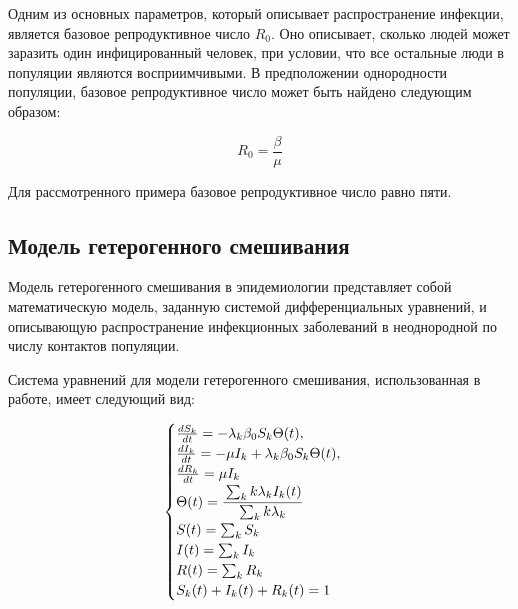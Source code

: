 \documentclass[14pt,a4paper]{article}
\begin{document}
 
 
Одним из основных параметров, который описывает распространение инфекции, является базовое репродуктивное число $R_0$. Оно описывает, сколько людей может заразить один инфицированный человек, при условии, что все остальные люди в популяции являются восприимчивыми. В предположении однородности популяции, базовое репродуктивное число может быть найдено следующим образом:

\begin{equation}
	R_0 = \frac{\beta}{\mu}
\end{equation}

Для рассмотренного примера базовое репродуктивное число равно пяти.
\subsection{Модель гетерогенного смешивания}

Модель гетерогенного смешивания в эпидемиологии представляет собой математическую модель, заданную системой дифференциальных уравнений, и описывающую распространение инфекционных заболеваний в неоднородной по числу контактов популяции.

Система уравнений для модели гетерогенного смешивания, использованная в работе, имеет следующий вид:

\begin{equation}
	\begin{cases}
		\frac{d S_k}{d t} = -\lambda_k \beta_0 S_k \Theta(t), \\
		\frac{d I_k}{d t} = -\mu I_k + \lambda_k \beta_0 S_k \Theta(t), \\
		\frac{d R_k}{d t} = \mu I_k \\
		\Theta(t)=\cfrac{\sum_{k} k \lambda_{k} I_{k}(t)}{\sum_{k} k \lambda_{k}} \\
		S(t)=\sum_{k} S_{k} \\
		I(t)=\sum_{k} I_{k} \\
		R(t)=\sum_{k} R_{k} \\
		S_k(t) + I_k(t) + R_k(t) = 1
	\end{cases}
	\label{eq:SIR_system_base_groups}
\end{equation}
\end{document}
